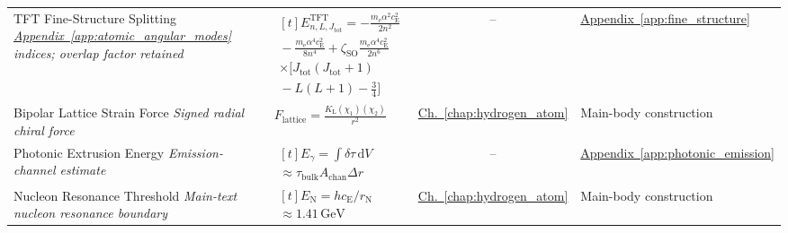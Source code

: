 \begin{longtable}{@{} p{4.5cm} p{6cm} c p{4cm} @{}}
{\raggedright TFT Fine-Structure Splitting \newline \textit{\hyperref[app:atomic_angular_modes]{Appendix~\ref*{app:atomic_angular_modes}} indices; overlap factor retained}\par} & {\raggedright $\begin{gathered}[t]E_{n,L,J_{\mathrm{tot}}}^{\mathrm{TFT}}=-\frac{m_{\mathrm e}\alpha^2c_{\mathrm E}^2}{2n^2} \\ {}-\frac{m_{\mathrm e}\alpha^4c_{\mathrm E}^2}{8n^4}+\zeta_{\mathrm{SO}}\frac{m_{\mathrm e}\alpha^4c_{\mathrm E}^2}{2n^6} \\ \times[J_{\mathrm{tot}}(J_{\mathrm{tot}}+1) \\ {}-L(L+1)-\tfrac34]\end{gathered}$\par} & -- & {\raggedright \hyperref[app:fine_structure]{Appendix~\ref*{app:fine_structure}}\par} \\

{\raggedright Bipolar Lattice Strain Force \newline \textit{Signed radial chiral force}\par} & {\raggedright $F_{\mathrm{lattice}} = \frac{K_{\mathrm{L}} (\chi_1)(\chi_2)}{r^2}$\par} & \hyperref[chap:hydrogen_atom]{Ch.~\ref*{chap:hydrogen_atom}} & {\raggedright Main-body construction\par} \\

{\raggedright Photonic Extrusion Energy \newline \textit{Emission-channel estimate}\par} & {\raggedright $\begin{gathered}[t]E_\gamma=\int\delta\tau\,\mathrm dV \\ \approx\tau_{\mathrm{bulk}}A_{\mathrm{chan}}\Delta r\end{gathered}$\par} & -- & {\raggedright \hyperref[app:photonic_emission]{Appendix~\ref*{app:photonic_emission}}\par} \\

{\raggedright Nucleon Resonance Threshold \newline \textit{Main-text nucleon resonance boundary}\par} & {\raggedright $\begin{gathered}[t]E_{\mathrm N}=hc_{\mathrm E}/r_{\mathrm N} \\ \approx1.41\,\mathrm{GeV}\end{gathered}$\par} & \hyperref[chap:hydrogen_atom]{Ch.~\ref*{chap:hydrogen_atom}} & {\raggedright Main-body construction\par} \\

\bottomrule
\end{longtable}

